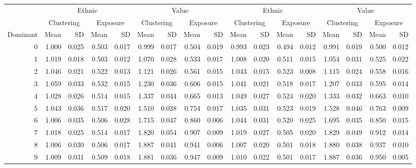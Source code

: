 \documentclass[
]{article}
\begin{document}
\begin{table}[H]
\begin{table}
{\begin{tabular}{r|r|r|r|r|r|r|r|r|r|r|r|r|r|r|r|r}
\cline{2-9} \cline{10-17}
\multicolumn{1}{c|}{ } & \multicolumn{4}{c|}{Ethnic} & \multicolumn{4}{c|}{Value} & \multicolumn{4}{c|}{Ethnic} & \multicolumn{4}{c}{Value} \\
\cline{2-5} \cline{6-9} \cline{10-13} \cline{14-17}
\multicolumn{1}{c|}{ } & \multicolumn{2}{c|}{Clustering} & \multicolumn{2}{c|}{Exposure} & \multicolumn{2}{c|}{Clustering} & \multicolumn{2}{c|}{Exposure} & \multicolumn{2}{c|}{Clustering} & \multicolumn{2}{c|}{Exposure} & \multicolumn{2}{c|}{Clustering} & \multicolumn{2}{c}{Exposure} \\
\cline{2-3} \cline{4-5} \cline{6-7} \cline{8-9} \cline{10-11} \cline{12-13} \cline{14-15} \cline{16-17}
Dominant & Mean & SD & Mean & SD & Mean & SD & Mean & SD & Mean & SD & Mean & SD & Mean & SD & Mean & SD\\
\hline
0 & 1.000 & 0.025 & 0.503 & 0.017 & 0.999 & 0.017 & 0.504 & 0.019 & 0.993 & 0.023 & 0.494 & 0.012 & 0.991 & 0.019 & 0.500 & 0.012\\
\hline
1 & 1.019 & 0.018 & 0.503 & 0.012 & 1.070 & 0.028 & 0.533 & 0.017 & 1.008 & 0.020 & 0.511 & 0.015 & 1.054 & 0.031 & 0.525 & 0.022\\
\hline
2 & 1.046 & 0.021 & 0.522 & 0.013 & 1.121 & 0.026 & 0.561 & 0.015 & 1.043 & 0.015 & 0.523 & 0.008 & 1.115 & 0.024 & 0.558 & 0.016\\
\hline
3 & 1.059 & 0.033 & 0.532 & 0.015 & 1.230 & 0.036 & 0.606 & 0.015 & 1.041 & 0.021 & 0.518 & 0.017 & 1.207 & 0.033 & 0.595 & 0.014\\
\hline
4 & 1.028 & 0.026 & 0.514 & 0.015 & 1.337 & 0.044 & 0.665 & 0.013 & 1.049 & 0.027 & 0.524 & 0.020 & 1.333 & 0.032 & 0.663 & 0.010\\
\hline
5 & 1.043 & 0.036 & 0.517 & 0.020 & 1.510 & 0.038 & 0.754 & 0.017 & 1.035 & 0.031 & 0.523 & 0.019 & 1.528 & 0.046 & 0.763 & 0.009\\
\hline
6 & 1.006 & 0.035 & 0.506 & 0.028 & 1.715 & 0.047 & 0.860 & 0.006 & 1.044 & 0.031 & 0.520 & 0.025 & 1.695 & 0.035 & 0.850 & 0.015\\
\hline
7 & 1.018 & 0.025 & 0.514 & 0.017 & 1.820 & 0.054 & 0.907 & 0.009 & 1.019 & 0.027 & 0.505 & 0.020 & 1.829 & 0.049 & 0.912 & 0.014\\
\hline
8 & 1.006 & 0.030 & 0.506 & 0.017 & 1.887 & 0.041 & 0.941 & 0.006 & 1.007 & 0.020 & 0.501 & 0.018 & 1.880 & 0.038 & 0.937 & 0.010\\
\hline
9 & 1.009 & 0.031 & 0.509 & 0.018 & 1.881 & 0.036 & 0.947 & 0.009 & 1.010 & 0.022 & 0.501 & 0.017 & 1.887 & 0.036 & 0.950 & 0.005\\

\end{tabular}}
\end{table}
\end{table}
\end{document}
